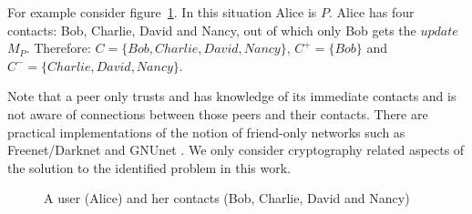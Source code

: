 For example consider figure~\ref{fig:fig1}. In this situation Alice is $P$. Alice has four contacts: Bob, Charlie, David and Nancy, out of which only Bob gets the $update$ $M_P$. Therefore: $C = \{Bob, Charlie, David,Nancy\}$, ${C^+ = \{Bob\}}$ and ${C^- = \{Charlie, David,Nancy\}}$. 

Note that a peer only trusts and has knowledge of its immediate contacts and is not aware of connections between those peers and their contacts. There are practical implementations of the notion of friend-only networks such as Freenet/Darknet \cite{darknet} and GNUnet \cite{gnunet}. We only consider cryptography related aspects of the solution to the identified problem in this work.

\begin{center}
\begin{figure}[here]
\caption{A user (Alice) and her contacts (Bob, Charlie, David and Nancy)}
\label{fig:fig1}
\end{figure}
\end{center}
